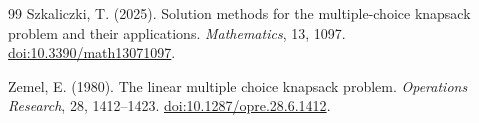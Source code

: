 \documentclass[11pt]{article}
\theoremstyle{plain}
\theoremstyle{definition}
\theoremstyle{remark}
\begin{document}
\begin{thebibliography}{99}
Szkaliczki, T. (2025).
\newblock Solution methods for the multiple-choice knapsack problem and their applications.
\newblock \emph{Mathematics}, 13, 1097.
\newblock \href{https://doi.org/10.3390/math13071097}{doi:10.3390/math13071097}.

Zemel, E. (1980).
\newblock The linear multiple choice knapsack problem.
\newblock \emph{Operations Research}, 28, 1412--1423.
\newblock \href{https://doi.org/10.1287/opre.28.6.1412}{doi:10.1287/opre.28.6.1412}.

\end{thebibliography}
\end{document}
